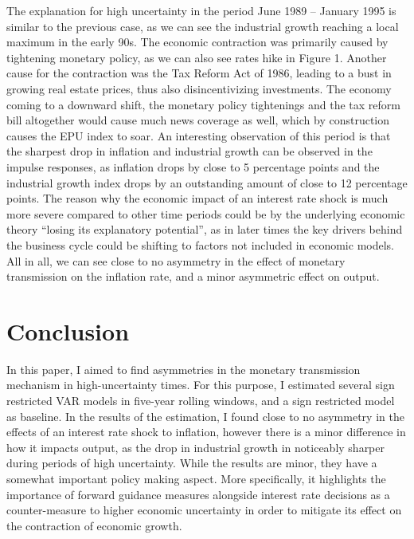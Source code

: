\documentclass[12pt,a4paper]{article}
\begin{document}
\noindent The explanation for high uncertainty in the period June 1989 – January 1995 is similar to the previous case, as we can see the industrial growth reaching a local maximum in the early 90s. The economic contraction was primarily caused by tightening monetary policy, as we can also see rates hike in Figure 1. Another cause for the contraction was the Tax Reform Act of 1986, leading to a bust in growing real estate prices, thus also disincentivizing investments. The economy coming to a downward shift, the monetary policy tightenings and the tax reform bill altogether would cause much news coverage as well, which by construction causes the EPU index to soar. An interesting observation of this period is that the sharpest drop in inflation and industrial growth can be observed in the impulse responses, as inflation drops by close to 5 percentage points and the industrial growth index drops by an outstanding amount of close to 12 percentage points. The reason why the economic impact of an interest rate shock is much more severe compared to other time periods could be by the underlying economic theory “losing its explanatory potential”, as in later times the key drivers behind the business cycle could be shifting to factors not included in economic models. All in all, we can see close to no asymmetry in the effect of monetary transmission on the inflation rate, and a minor asymmetric effect on output.

\section{Conclusion}
In this paper, I aimed to find asymmetries in the monetary transmission mechanism in high-uncertainty times. For this purpose, I estimated several sign restricted VAR models in five-year rolling windows, and a sign restricted model as baseline. In the results of the estimation, I found close to no asymmetry in the effects of an interest rate shock to inflation, however there is a minor difference in how it impacts output, as the drop in industrial growth in noticeably sharper during periods of high uncertainty. While the results are minor, they have a somewhat important policy making aspect. More specifically, it highlights the importance of forward guidance measures alongside interest rate decisions as a counter-measure to higher economic uncertainty in order to mitigate its effect on the contraction of economic growth. 

\printbibliography[title = References]
	
	
\end{document}
